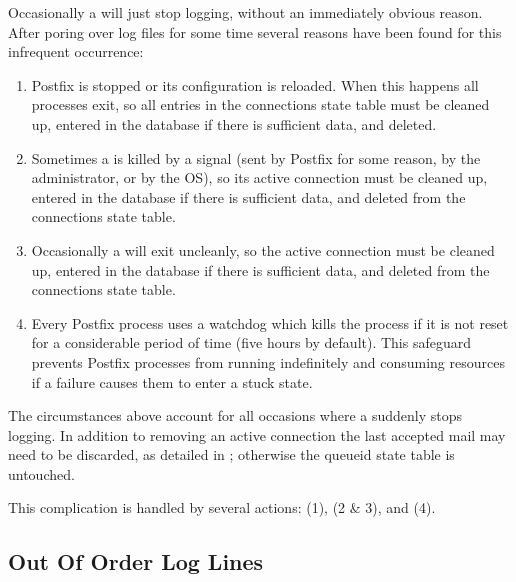 \label{smtpd stops logging}

Occasionally a  will just stop logging, without an
immediately obvious reason.  After poring over log files for some time
several reasons have been found for this infrequent occurrence:

\begin{enumerate}

    \item Postfix is stopped or its configuration is reloaded.  When this
        happens all  processes exit, so all entries in the
        connections state table must be cleaned up, entered in the database
        if there is sufficient data, and deleted.

    \item Sometimes a  is killed by a signal (sent by Postfix
        for some reason, by the administrator, or by the OS), so its active
        connection must be cleaned up, entered in the database if there is
        sufficient data, and deleted from the connections state table.

    \item Occasionally a  will exit uncleanly, so the active
        connection must be cleaned up, entered in the database if there is
        sufficient data, and deleted from the connections state table.

    \item Every Postfix process uses a watchdog which kills the process if
        it is not reset for a considerable period of time (five hours by
        default).  This safeguard prevents Postfix processes from running
        indefinitely and consuming resources if a failure causes them to
        enter a stuck state.

\end{enumerate}

The circumstances above account for all occasions where a 
suddenly stops logging.  In addition to removing an active connection the
last accepted mail may need to be discarded, as detailed in
; otherwise the queueid state table
is untouched.

This complication is handled by several actions:  (1),
 (2 \& 3), and  (4).


\subsection{Out Of Order Log Lines}

